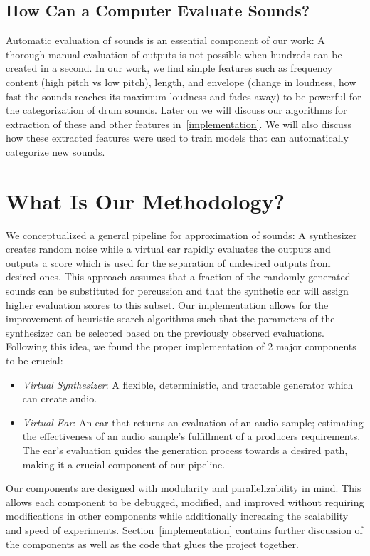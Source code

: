 \documentclass[runningheads,a4paper]{llncs}
\begin{document}
\subsection{How Can a Computer Evaluate Sounds?}
Automatic evaluation of sounds is an essential component of our work: A thorough manual evaluation of outputs is not possible when hundreds can be created in a second. In our work, we find simple features such as frequency content (high pitch vs low pitch), length, and envelope (change in loudness, how fast the sounds reaches its maximum loudness and fades away) to be powerful for the categorization of drum sounds. Later on we will discuss our algorithms for extraction of these and other features in~\ref{implementation}. We will also discuss how these extracted features were used to train models that can automatically categorize new sounds.  

\section{What Is Our Methodology?}
\label{sec_methodology}
We conceptualized a general pipeline for approximation of sounds: A synthesizer creates random noise while a virtual ear rapidly evaluates the outputs and outputs a score which is used for the separation of undesired outputs from desired ones. This approach assumes that a fraction of the randomly generated sounds can be substituted for percussion and that the synthetic ear will assign higher evaluation scores to this subset. Our implementation allows for the improvement of heuristic search algorithms such that the parameters of the synthesizer can be selected based on the previously observed evaluations. Following this idea, we found the proper implementation of 2 major components to be crucial:

\begin{itemize}
    \item \textit{Virtual Synthesizer}: A flexible, deter\-min\-istic, and tract\-able gener\-ator which can create audio. 
    \item \textit{Virtual Ear}: An ear that returns an evaluation of an audio sample; estimating the effectiveness of an audio sample's fulfillment of a producers requirements. The ear's evaluation guides the generation process towards a desired path, making it a crucial component of our pipeline. 
\end{itemize}

Our components are designed with modularity and parallelizability in mind. This allows each component to be debugged, modified, and improved without requiring modifications in other components while additionally increasing the scalability and speed of experiments. 
Section~\ref{implementation} contains further discussion of the components as well as the code that glues the project together.
\end{document}

